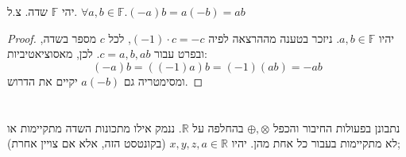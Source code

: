 \documentclass[]{article}
\newcommand\R     {\mathbb{R}}
\begin{document}
	
	\section{}
	יהי $\mathbb{F}$ שדה. צ.ל. $\forall a, b \in \mathbb{F}. (-a)b = a(-b) = ab$
	\begin{proof}
		יהיו $a, b \in \mathbb{F}$. ניזכר בטענה מההרצאה לפיה $(-1) \cdot c = -c$, לכל $c$ מספר בשדה, ובפרט עבור $c = a, b, ab$. לכן, מאסוציאטיביות: 
		\[ (-a)b = ((-1)a)b = (-1)(ab) = -ab \]
		ומסימטריה גם $a(-b)$ יקיים את הדרוש. 
	\end{proof}
	
	\section{}
	נתבונן בפעולות החיבור והכפל $\oplus, \otimes$ בהחלפה על $\R$. ננמק אילו מתכונות השדה מתקיימות או לא מתקיימות בעבור כל אחת מהן. יהיו $x, y, z, a \in \R$ (בקונטסט הזה, אלא אם צויין אחרת);
\end{document}

